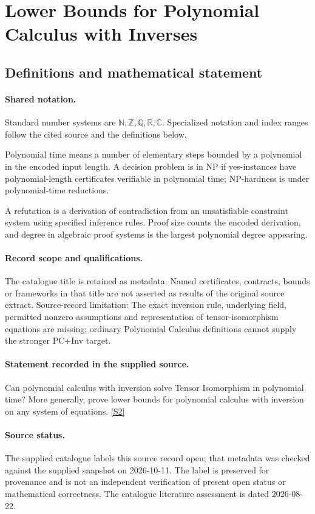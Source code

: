 \documentclass[11pt]{article}
\newcommand{\sref}[2]{\hyperlink{source:#1:#2}{[S#2]}}
\begin{document}
\section{Lower Bounds for Polynomial Calculus with Inverses}\label{statement}

\subsection{Definitions and mathematical statement}

\paragraph{Shared notation.}Standard number systems are $\mathbb N,\mathbb Z,\mathbb Q,\mathbb R,\mathbb C$. Specialized notation and index ranges follow the cited source and the definitions below.


Polynomial time means a number of elementary steps bounded by a polynomial in the encoded input length. A decision problem is in $\mathrm{NP}$ if yes-instances have polynomial-length certificates verifiable in polynomial time; NP-hardness is under polynomial-time reductions.

A refutation is a derivation of contradiction from an unsatisfiable constraint system using specified inference rules. Proof size counts the encoded derivation, and degree in algebraic proof systems is the largest polynomial degree appearing.
\paragraph{Record scope and qualifications.}
The catalogue title is retained as metadata. Named certificates, contracts, bounds or frameworks in that title are not asserted as results of the original source extract.
Source-record limitation: The exact inversion rule, underlying field, permitted nonzero assumptions and representation of tensor-isomorphism equations are missing; ordinary Polynomial Calculus definitions cannot supply the stronger PC+Inv target.
\paragraph{Statement recorded in the supplied source.}
Can polynomial calculus with inversion solve Tensor Isomorphism in polynomial time? More generally, prove lower bounds for polynomial calculus with inversion on any system of equations. \sref{statement}{2}
\paragraph{Source status.}
The supplied catalogue labels this source record open; that metadata was checked against the supplied snapshot on 2026-10-11. The label is preserved for provenance and is not an independent verification of present open status or mathematical correctness. The catalogue literature assessment is dated 2026-08-22.
\end{document}
